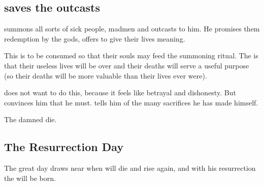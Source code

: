 \subsection{\Thanatzil{} saves the outcasts}
\Thanatzil{} summons all sorts of sick people, madmen and outcasts to him. 
He promises them redemption by the \bane{} gods, offers to give their lives meaning. 

This  is to be consumed so that their souls may feed the summoning ritual. 
The  is that their useless lives will be over and their deaths will serve a useful purpose (so their deaths will be more valuable than their lives ever were). 

\Thanatzil{} does not want to do this, because it feels like betrayal and dishonesty. 
But \Semiza{} convinces him that he must. 
\Semiza{} tells him of the many sacrifices he has made himself. 


The damned die. 










\subsection{The Resurrection Day}
The great day draws near when \Thanatzil{} will die and rise again, and with his resurrection the \resphain{} will be born. 

